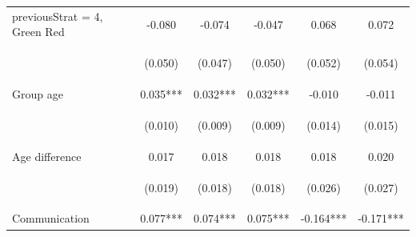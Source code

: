 \documentclass{article} %
\begin{document}
\begin{table}[H]
\begin{center}
\begin{tabular}{lccccc}
previousStrat = 4, Green Red & -0.080 & -0.074 & -0.047 & 0.068 & 0.072 \\
\vspace{4pt} & \begin{footnotesize}(0.050)\end{footnotesize} & \begin{footnotesize}(0.047)\end{footnotesize} & \begin{footnotesize}(0.050)\end{footnotesize} & \begin{footnotesize}(0.052)\end{footnotesize} & \begin{footnotesize}(0.054)\end{footnotesize} \\
Group age & 0.035*** & 0.032*** & 0.032*** & -0.010 & -0.011 \\
\vspace{4pt} & \begin{footnotesize}(0.010)\end{footnotesize} & \begin{footnotesize}(0.009)\end{footnotesize} & \begin{footnotesize}(0.009)\end{footnotesize} & \begin{footnotesize}(0.014)\end{footnotesize} & \begin{footnotesize}(0.015)\end{footnotesize} \\
Age difference & 0.017 & 0.018 & 0.018 & 0.018 & 0.020 \\
\vspace{4pt} & \begin{footnotesize}(0.019)\end{footnotesize} & \begin{footnotesize}(0.018)\end{footnotesize} & \begin{footnotesize}(0.018)\end{footnotesize} & \begin{footnotesize}(0.026)\end{footnotesize} & \begin{footnotesize}(0.027)\end{footnotesize} \\
Communication & 0.077*** & 0.074*** & 0.075*** & -0.164*** & -0.171*** \\

\end{tabular}
\end{center}
\end{table}
\end{document}
